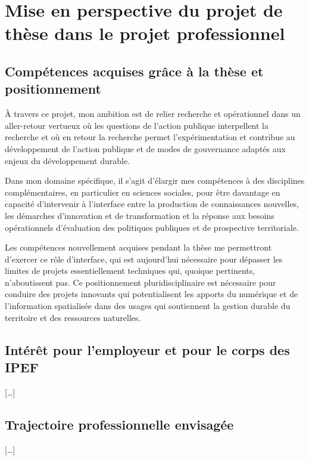 \section[suites]
{Mise en perspective du projet de thèse dans le projet professionnel}

\subsection
{Compétences acquises grâce à la thèse et positionnement}

À travers ce projet, mon ambition est de relier recherche et opérationnel dans
un aller-retour vertueux où les questions de l’action publique interpellent la
recherche et où en retour la recherche permet l’expérimentation et contribue
au développement de l’action publique et de modes de gouvernance adaptés aux
enjeux du développement durable.

Dans mon domaine spécifique, il s'agit d'élargir mes compétences à des
disciplines complémentaires, en particulier en sciences sociales, pour être
davantage en capacité d'intervenir à l'interface entre la production de
connaissances nouvelles, les démarches d'innovation et de transformation et la
réponse aux besoins opérationnels d'évaluation des politiques publiques et de
prospective territoriale.

Les compétences nouvellement acquises pendant la thèse me permettront d'exercer
ce rôle d'interface, qui est aujourd'hui nécessaire pour dépasser les limites
de projets essentiellement techniques qui, quoique pertinents, n'aboutissent
pas. Ce positionnement pluridisciplinaire est nécessaire pour conduire des
projets innovants qui potentialisent les apports du numérique et de
l'information spatialisée dans des usages qui soutiennent la gestion durable
du territoire et des ressources naturelles.

\subsection
{Intérêt pour l'employeur et pour le corps des IPEF}

[\dots]

\subsection
{Trajectoire professionnelle envisagée}

[\dots]